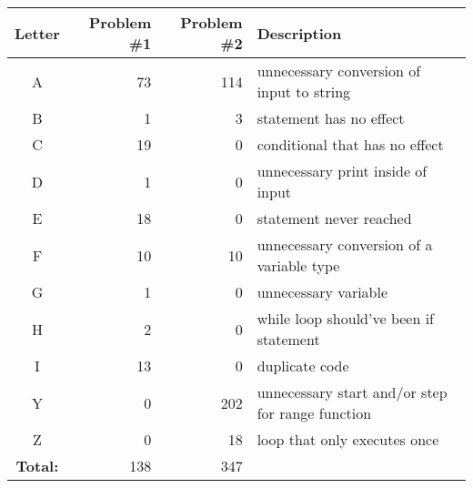 \vspace{2em}
\small
\begin{supertabular}{crrp{.5\textwidth}}
\label{labelsA}
Letter & Problem \#1 & Problem \#2 & Description \\ 
\toprule
A & 73 & 114 & unnecessary conversion of input to string \\
B & 1 & 3 & statement has no effect \\
C & 19 & 0 & conditional that has no effect \\
D & 1 & 0 & unnecessary print inside of input \\
E & 18 & 0 & statement never reached \\
F & 10 & 10 & unnecessary conversion of a variable type \\
G & 1 & 0 & unnecessary variable \\
H & 2 & 0 & while loop should've been if statement \\
I & 13 & 0 & duplicate code \\
Y & 0 & 202 & unnecessary start and/or step for range function \\
Z & 0 & 18 & loop that only executes once \\
\bottomrule
\textbf{Total:} & 138 & 347 & \\
\end{supertabular}
\vspace{2em}